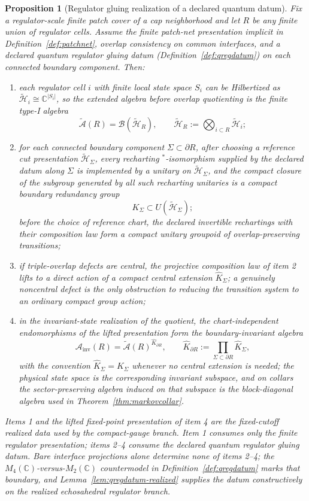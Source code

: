 \documentclass[11pt]{article}
\newtheorem{proposition}[theorem]{Proposition}
\begin{document}
\begin{proposition}[Regulator gluing realization of a declared quantum datum]\label{prop:regulatedrealization}
Fix a regulator-scale finite patch cover of a cap neighborhood and let \(R\) be any finite union of regulator cells. Assume the finite patch-net presentation implicit in Definition~\ref{def:patchnet}, overlap consistency on common interfaces, and a declared quantum regulator gluing datum (Definition~\ref{def:qregdatum}) on each connected boundary component. Then:
\begin{enumerate}[leftmargin=2em]
\item each regulator cell \(i\) with finite local state space \(S_i\) can be Hilbertized as \(\tilde{\mathcal H}_i\cong \mathbb C^{|S_i|}\), so the extended algebra before overlap quotienting is the finite type-I algebra
\[
\widetilde{\mathcal A}(R)=\mathcal B(\tilde{\mathcal H}_R),
\qquad
\tilde{\mathcal H}_R:=\bigotimes_{i\subset R}\tilde{\mathcal H}_i;
\]
\item for each connected boundary component \(\Sigma\subset\partial R\), after choosing a reference cut presentation \(\tilde{\mathcal H}_\Sigma\), every recharting \(^*\)-isomorphism supplied by the declared datum along \(\Sigma\) is implemented by a unitary on \(\tilde{\mathcal H}_\Sigma\), and the compact closure of the subgroup generated by all such recharting unitaries is a compact boundary redundancy group
\[
K_\Sigma\subset U(\tilde{\mathcal H}_\Sigma);
\]
before the choice of reference chart, the declared invertible rechartings with their composition law form a compact unitary groupoid of overlap-preserving transitions;
\item if triple-overlap defects are central, the projective composition law of item 2 lifts to a direct action of a compact central extension \(\widehat K_\Sigma\); a genuinely noncentral defect is the only obstruction to reducing the transition system to an ordinary compact group action;
\item in the invariant-state realization of the quotient, the chart-independent endomorphisms of the lifted presentation form the boundary-invariant algebra
\[
\mathcal A_{\mathrm{inv}}(R)=\widetilde{\mathcal A}(R)^{\widehat K_{\partial R}},
\qquad
\widehat K_{\partial R}:=\prod_{\Sigma\subset\partial R}\widehat K_\Sigma,
\]
\noindent with the convention \(\widehat K_\Sigma=K_\Sigma\) whenever no central extension is needed; the physical state space is the corresponding invariant subspace, and on collars the sector-preserving algebra induced on that subspace is the block-diagonal algebra used in Theorem~\ref{thm:markovcollar}.
\end{enumerate}
Items 1 and the lifted fixed-point presentation of item 4 are the fixed-cutoff realized data used by the compact-gauge branch. Item 1 consumes only the finite regulator presentation; items 2--4 consume the declared quantum regulator gluing datum. Bare interface projections alone determine none of items 2--4; the \(M_4(\mathbb C)\)-versus-\(M_2(\mathbb C)\) countermodel in Definition~\ref{def:qregdatum} marks that boundary, and Lemma~\ref{lem:qregdatum-realized} supplies the datum constructively on the realized echosahedral regulator branch.
\end{proposition}
\end{document}

